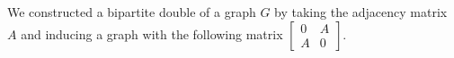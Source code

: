 \begin{recall}
	We constructed a bipartite double of a graph \(G\) by taking the adjacency matrix \(A\) and inducing a graph with the following matrix \(\begin{bmatrix} 0&A\\
	A&0\end{bmatrix} \).
\end{recall}
